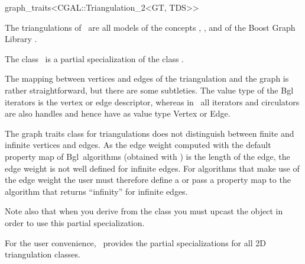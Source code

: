 

\begin{ccRefClass}{graph_traits<CGAL::Triangulation_2<GT, TDS>>}

\ccDefinition
  
The triangulations of \cgal\ are all models of the concepts ,
, and   of the Boost Graph Library \cite{}.

The class \ccRefName\ is a partial specialization of the class 
{}.


The mapping between vertices and edges of the triangulation and the
graph is rather straightforward, but there are some subtleties. The
value type of the {\sc Bgl} iterators is the vertex or edge descriptor,
whereas in \cgal\ all iterators and circulators are also handles and
hence have as value type Vertex or Edge.

The graph traits class for triangulations does not distinguish between
finite and infinite vertices and edges. As the edge weight computed
with the default property map of {\sc Bgl}\ algorithms (obtained with
) is the length of the edge, 
the edge weight is not well defined for infinite edges. For algorithms 
that make use of the edge weight the user must therefore
define a 
{} or pass a property map to the
algorithm that returns ``infinity'' for infinite edges. 


Note also that when you derive from the class 
you must upcast the object in order to use this partial specialization.

For the user convenience, \cgal\ provides the partial specializations
for all 2D triangulation classes.






\ccTypes




\end{ccRefClass}
